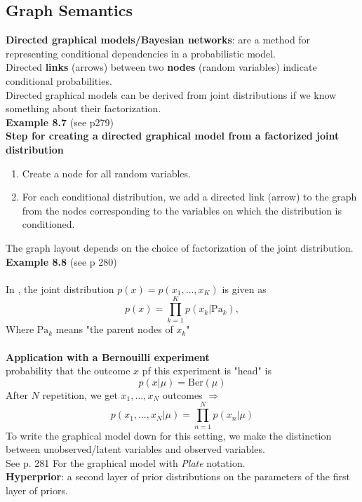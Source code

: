 \subsection{Graph Semantics}
\textbf{Directed graphical models/Bayesian networks}: are a method for representing conditional dependencies in a probabilistic model.\\
Directed \textbf{links} (arrows) between two \textbf{nodes} (random variables) indicate conditional probabilities. \\ 
Directed graphical models can be derived from joint distributions if we know something about their factorization. \\
\textbf{Example 8.7} (see p279) \\
\textbf{Step for creating a directed graphical model from a factorized joint distribution}
\begin{enumerate}
	\item Create a node for all random variables.
	\item For each conditional distribution, we add a directed link (arrow) to the graph from the nodes corresponding to the variables on which the distribution is conditioned.
\end{enumerate}
The graph layout depends on the choice of factorization of the joint distribution.
\textbf{Example 8.8} (see p 280) \\ \\
In , the joint distribution $p(x) = p(x_1,\dots,x_K)$ is given as 
\[
p(x) = \prod_{k=1}^{K} p(x_k| \text{Pa}_k), \tag{8.31}
\]
Where $\text{Pa}_k$ means "the parent nodes of $x_k$" \\ \\
\textbf{Application with a Bernouilli experiment}\\
probability that the outcome $x$ pf this experiment is "head" is 
\[
p(x|\mu) = \text{Ber} (\mu) \tag{8.32}
\] 
After $N$ repetition, we get $x_1,\dots,x_N$ outcomes $\Rightarrow$ 
\[
p(x_1,\dots,x_N | \mu ) = \prod_{n=1}^{N} p(x_n | \mu) \tag{8.33}
\]
To write the graphical model down for this setting, we make the distinction between unobserved/latent variables and observed variables.
\\ See p. 281 For the graphical model with \textit{Plate} notation. \\
\textbf{Hyperprior}: a second layer of prior distributions on the parameters of the first layer of priors.
